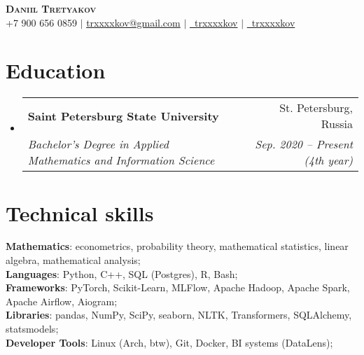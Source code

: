 \documentclass[a4paper, 11pt]{article}
\makeatletter
\newcommand{\resumeSubheading}[4]{
  \vspace{-2pt}\item
    \begin{tabular*}{0.97\textwidth}[t]{l@{\extracolsep{\fill}}r}
      \textbf{#1} & #2 \\
      \textit{\small#3} & \textit{\small #4} \\
    \end{tabular*}\vspace{-7pt}
}
\newcommand{\resumeSubHeadingListStart}{\begin{itemize}[leftmargin=0.15in, label={}]}
\newcommand{\resumeSubHeadingListEnd}{\end{itemize}}
\makeatother
\begin{document}
\begin{center}
    \textbf{\Huge \scshape Daniil Tretyakov} \\ \vspace{5pt}
    \small +7 900 656 0859 $|$ \href{mailto:trxxxxkov@gmail.com}{trxxxxkov@gmail.com} $|$ 
    \href{https://t.me/trxxxxkov}{\faTelegram \ trxxxxkov} $|$
    \href{https://github.com/trxxxxkov}{\faGithub \ trxxxxkov}
\end{center}


\section{Education}
  \resumeSubHeadingListStart
    \resumeSubheading
      {Saint Petersburg State University}{St. Petersburg, Russia}
      {Bachelor's Degree in Applied Mathematics and Information Science}
      {Sep. 2020 -- Present (4th year)}
  \resumeSubHeadingListEnd


\section{Technical skills}
 \begin{itemize}[leftmargin=0.15in, label={}]
    \small{\item{
        \textbf{Mathematics}{: econometrics, probability theory, mathematical statistics, linear algebra, mathematical analysis;} \\    
        \vspace{3pt}
        \textbf{Languages}{: Python, C++, SQL (Postgres), R, Bash;} \\
        \vspace{3pt}
        \textbf{Frameworks}{: PyTorch, Scikit-Learn, MLFlow, Apache Hadoop, Apache Spark, Apache Airflow, Aiogram;} \\
        \vspace{3pt}
        \textbf{Libraries}{: pandas, NumPy, SciPy, seaborn, NLTK, Transformers, SQLAlchemy, statsmodels;} \\
        \vspace{3pt}
        \textbf{Developer Tools}{: Linux (Arch, btw), Git, Docker, BI systems (DataLens);} \\
    }}
 \end{itemize}

\end{document}
